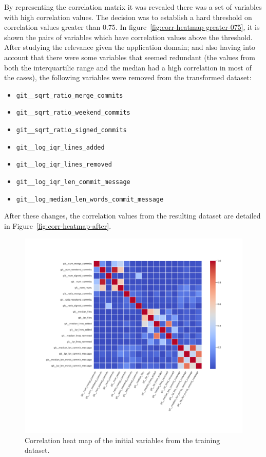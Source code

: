 \documentclass[a4paper, 12pt]{book}
\begin{document}
By representing the correlation matrix it was revealed there was a set of variables with high correlation values. The decision was to establish a hard threshold on correlation values greater than 0.75. In figure~\ref{fig:corr-heatmap-greater-075}, it is shown the pairs of variables which have correlation values above the threshold. After studying the relevance given the application domain; and also having into account that there were some variables that seemed redundant (the values from both the interquartilic range and the median had a high correlation in most of the cases), the following variables were removed from the transformed dataset: 
\begin{itemize}
\item \texttt{git\_\_sqrt\_ratio\_merge\_commits}
\item \texttt{git\_\_sqrt\_ratio\_weekend\_commits}
\item \texttt{git\_\_sqrt\_ratio\_signed\_commits}
\item \texttt{git\_\_log\_iqr\_lines\_added}
\item \texttt{git\_\_log\_iqr\_lines\_removed}
\item \texttt{git\_\_log\_iqr\_len\_commit\_message}
\item \texttt{git\_\_log\_median\_len\_words\_commit\_message}
\end{itemize}

After these changes, the correlation values from the resulting dataset are detailed in Figure~\ref{fig:corr-heatmap-after}.



\begin{figure}
 \centering
  \includegraphics[width=18cm, keepaspectratio]{img/eda_corr_heatmap_before.png}
  \caption{Correlation heat map of the initial variables from the training dataset.}
  \label{fig:corr-heatmap-before}
\end{figure}
\end{document}
